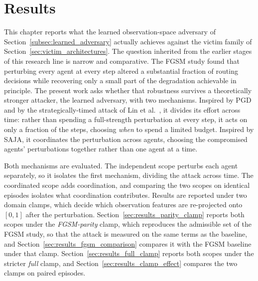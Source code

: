 
%

\chapter{Results}
\label{chap:results}

This chapter reports what the learned observation-space adversary of
Section~\ref{subsec:learned_adversary} actually achieves against the victim family of
Section~\ref{sec:victim_architectures}. The question inherited from the earlier
stages of this research line is narrow and comparative. The FGSM study found that
perturbing every agent at every step altered a substantial fraction of routing
decisions while recovering only a small part of the degradation achievable in
principle. The present work asks whether that robustness survives a theoretically
stronger attacker, the learned adversary, with two mechanisms. Inspired by
PGD and by the strategically-timed attack of Lin et
al.~\cite{lin2019tacticsadversarialattackdeep}, it divides its effort across time:
rather than spending a full-strength
perturbation at every step, it acts on only a fraction of the steps, choosing
\emph{when} to spend a limited budget. Inspired by SAJA, it coordinates the perturbation
across agents, choosing the compromised agents' perturbations together rather than one
agent at a time.

Both mechanisms are evaluated. The independent scope perturbs each agent separately, so
it isolates the first mechanism, dividing the attack across time. The coordinated scope
adds coordination, and comparing the two scopes on identical episodes isolates what
coordination contributes. Results are reported under two domain clamps, which decide
which observation features are re-projected onto $[0,1]$ after the perturbation.
Section~\ref{sec:results_parity_clamp} reports both scopes under the
\emph{FGSM-parity} clamp, which reproduces the admissible set of the FGSM study, so
that the attack is measured on the same terms as the baseline, and
Section~\ref{sec:results_fgsm_comparison} compares it with the FGSM baseline under that
clamp. Section~\ref{sec:results_full_clamp} reports both scopes under the stricter
\emph{full} clamp, and Section~\ref{sec:results_clamp_effect} compares the two clamps
on paired episodes.

